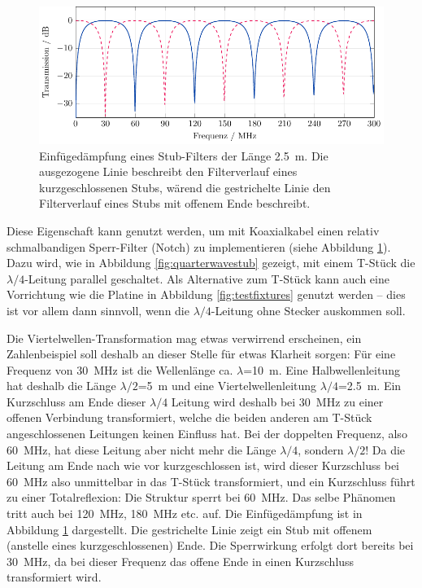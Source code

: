 \documentclass[twoside,a4paper,11pt,halfparskip,DIV=11,notitlepage]{scrartcl}
\begin{document}
\begin{figure}[H]
    \begin{center}\includegraphics{figures/stub/stub.pdf}\end{center}
\caption{Einfügedämpfung eines Stub-Filters der Länge 2.5~m. Die ausgezogene Linie beschreibt den Filterverlauf
eines kurzgeschlossenen Stubs, wärend die gestrichelte Linie den Filterverlauf eines Stubs mit offenem Ende beschreibt.}
\label{fig:quarterwaveplot}
\end{figure}

Diese Eigenschaft kann genutzt werden, um mit Koaxialkabel einen relativ
schmalbandigen Sperr-Filter (Notch) zu implementieren (siehe Abbildung
\ref{fig:quarterwaveplot}). Dazu wird, wie in Abbildung
\ref{fig:quarterwavestub} gezeigt, mit einem T-Stück die $\lambda/4$-Leitung
parallel geschaltet. Als Alternative zum T-Stück kann auch eine Vorrichtung wie
die Platine in Abbildung \ref{fig:testfixtures} genutzt werden -- dies ist vor
allem dann sinnvoll, wenn die $\lambda/4$-Leitung ohne Stecker auskommen soll.

Die Viertelwellen-Transformation mag etwas verwirrend erscheinen, ein Zahlenbeispiel
soll deshalb an dieser Stelle für etwas Klarheit sorgen: Für eine Frequenz von
30~MHz ist die Wellenlänge ca. $\lambda$=10~m. Eine Halbwellenleitung hat deshalb
die Länge $\lambda/2$=5~m und eine Viertelwellenleitung $\lambda/4$=2.5~m. Ein
Kurzschluss am Ende dieser $\lambda/4$ Leitung wird deshalb bei 30~MHz zu einer
offenen Verbindung transformiert, welche die beiden anderen am T-Stück
angeschlossenen Leitungen keinen Einfluss hat. Bei der doppelten Frequenz, also
60~MHz, hat diese Leitung aber nicht mehr die Länge  $\lambda/4$, sondern
$\lambda/2$! Da die Leitung am Ende nach wie vor kurzgeschlossen ist, wird dieser
Kurzschluss bei 60~MHz also unmittelbar in das T-Stück transformiert, und ein
Kurzschluss führt zu einer Totalreflexion: Die Struktur sperrt bei 60~MHz. Das
selbe Phänomen tritt auch bei 120~MHz, 180~MHz etc. auf. Die Einfügedämpfung
ist in Abbildung \ref{fig:quarterwaveplot} dargestellt. Die gestrichelte Linie
zeigt ein Stub mit offenem (anstelle eines kurzgeschlossenen) Ende. Die Sperrwirkung
erfolgt dort bereits bei 30~MHz, da bei dieser Frequenz das offene Ende in einen
Kurzschluss transformiert wird.
\end{document}
